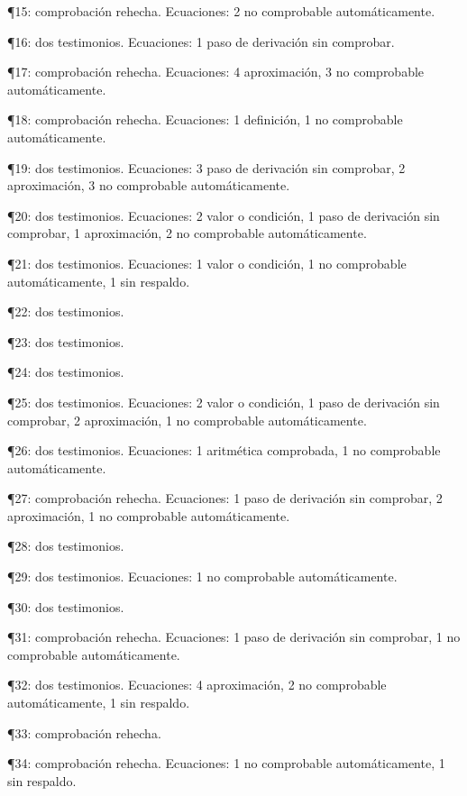 \documentclass[10pt,openany]{book}
\begin{document}
\noindent ¶15: comprobación rehecha. Ecuaciones: 2 no comprobable automáticamente.\par
\noindent ¶16: dos testimonios. Ecuaciones: 1 paso de derivación sin comprobar.\par
\noindent ¶17: comprobación rehecha. Ecuaciones: 4 aproximación, 3 no comprobable automáticamente.\par
\noindent ¶18: comprobación rehecha. Ecuaciones: 1 definición, 1 no comprobable automáticamente.\par
\noindent ¶19: dos testimonios. Ecuaciones: 3 paso de derivación sin comprobar, 2 aproximación, 3 no comprobable automáticamente.\par
\noindent ¶20: dos testimonios. Ecuaciones: 2 valor o condición, 1 paso de derivación sin comprobar, 1 aproximación, 2 no comprobable automáticamente.\par
\noindent ¶21: dos testimonios. Ecuaciones: 1 valor o condición, 1 no comprobable automáticamente, 1 sin respaldo.\par
\noindent ¶22: dos testimonios.\par
\noindent ¶23: dos testimonios.\par
\noindent ¶24: dos testimonios.\par
\noindent ¶25: dos testimonios. Ecuaciones: 2 valor o condición, 1 paso de derivación sin comprobar, 2 aproximación, 1 no comprobable automáticamente.\par
\noindent ¶26: dos testimonios. Ecuaciones: 1 aritmética comprobada, 1 no comprobable automáticamente.\par
\noindent ¶27: comprobación rehecha. Ecuaciones: 1 paso de derivación sin comprobar, 2 aproximación, 1 no comprobable automáticamente.\par
\noindent ¶28: dos testimonios.\par
\noindent ¶29: dos testimonios. Ecuaciones: 1 no comprobable automáticamente.\par
\noindent ¶30: dos testimonios.\par
\noindent ¶31: comprobación rehecha. Ecuaciones: 1 paso de derivación sin comprobar, 1 no comprobable automáticamente.\par
\noindent ¶32: dos testimonios. Ecuaciones: 4 aproximación, 2 no comprobable automáticamente, 1 sin respaldo.\par
\noindent ¶33: comprobación rehecha.\par
\noindent ¶34: comprobación rehecha. Ecuaciones: 1 no comprobable automáticamente, 1 sin respaldo.\par
\end{document}
